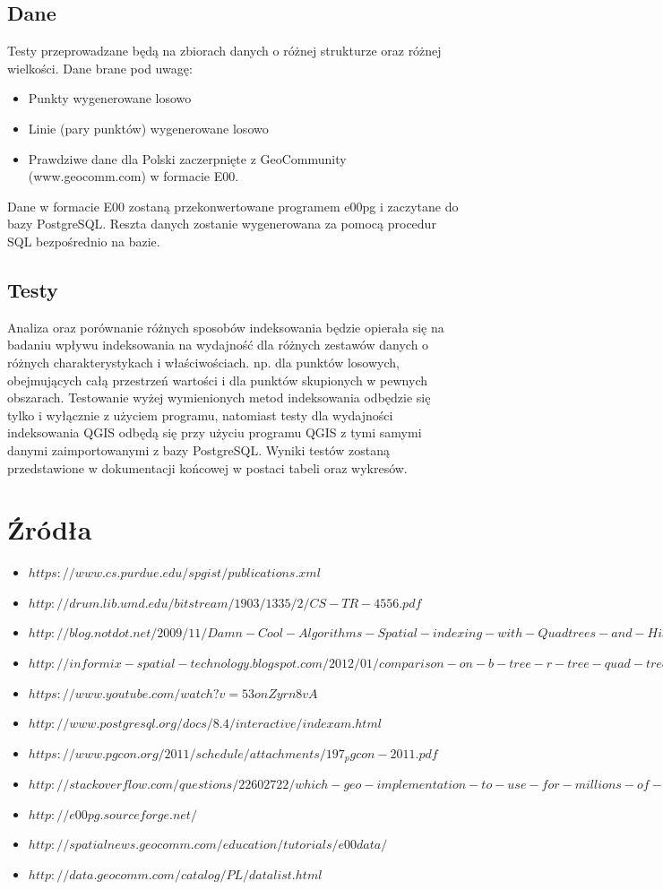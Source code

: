 \documentclass[11pt,a4paper]{article}
\begin{document}
\subsection{Dane}
Testy przeprowadzane będą na zbiorach danych o różnej strukturze oraz różnej wielkości. Dane brane pod uwagę:
\begin{itemize}
	\item Punkty wygenerowane losowo
	\item Linie (pary punktów) wygenerowane losowo
	\item Prawdziwe dane dla Polski zaczerpnięte z GeoCommunity (www.geocomm.com) w formacie E00.
\end{itemize}
Dane w formacie E00 zostaną przekonwertowane programem e00pg i zaczytane do bazy PostgreSQL. Reszta danych zostanie 
wygenerowana za pomocą procedur SQL bezpośrednio na bazie.
\subsection{Testy}
Analiza oraz porównanie różnych sposobów indeksowania będzie opierała się na badaniu wpływu indeksowania na wydajność dla różnych
zestawów danych o różnych charakterystykach i właściwościach. np. dla punktów losowych, obejmujących całą przestrzeń wartości i dla punktów skupionych
w pewnych obszarach. Testowanie wyżej wymienionych metod indeksowania odbędzie się tylko i wyłącznie z użyciem programu, natomiast testy dla
wydajności indeksowania QGIS odbędą się przy użyciu programu QGIS z tymi samymi danymi zaimportowanymi z bazy PostgreSQL. Wyniki testów
zostaną przedstawione w dokumentacji końcowej w postaci tabeli oraz wykresów.

\section{Źródła}
\begin{itemize}
	\item $https://www.cs.purdue.edu/spgist/publications.xml$
	\item $http://drum.lib.umd.edu/bitstream/1903/1335/2/CS-TR-4556.pdf$
	\item $http://blog.notdot.net/2009/11/Damn-Cool-Algorithms-Spatial-indexing-with-Quadtrees-and-Hilbert-Curves$
	\item $http://informix-spatial-technology.blogspot.com/2012/01/comparison-on-b-tree-r-tree-quad-tree.html$
	\item $https://www.youtube.com/watch?v=53onZyrn8vA$
	\item $http://www.postgresql.org/docs/8.4/interactive/indexam.html$
	\item $https://www.pgcon.org/2011/schedule/attachments/197_pgcon-2011.pdf$
	\item $http://stackoverflow.com/questions/22602722/which-geo-implementation-to-use-for-millions-of-points$
	\item $http://e00pg.sourceforge.net/$
	\item $http://spatialnews.geocomm.com/education/tutorials/e00data/$
	\item $http://data.geocomm.com/catalog/PL/datalist.html$
\end{itemize}
\end{document}
